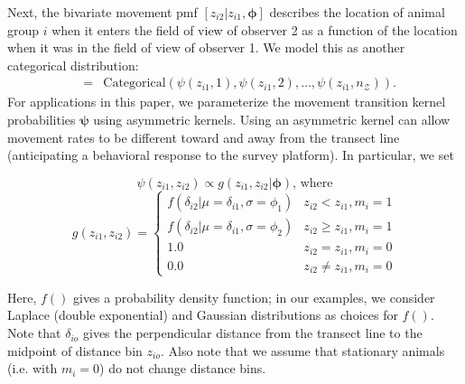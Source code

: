 \documentclass[12pt,fleqn]{article}
\begin{document}
Next, the bivariate movement pmf $[z_{i2}|z_{i1},\boldsymbol{\phi}]$ describes the location of animal group $i$ when it enters the field of view of observer 2 as a function of the location when it was in the field of view of observer 1.  We model this as another categorical distribution:
\begin{eqnarray*}
  [z_{i2}|z_{i1},\boldsymbol{\phi}] & = & \text{Categorical} \left( \psi(z_{i1},1),\psi(z_{i1},2),\hdots,\psi(z_{i1},n_\mathcal{Z}) \right).
\end{eqnarray*}
For applications in this paper, we parameterize the movement transition kernel probabilities $\boldsymbol{\psi}$ using asymmetric kernels.  Using an asymmetric kernel can allow movement rates to be different toward and away from the transect line (anticipating a behavioral response to the survey platform). In particular, we set
\begin{linenomath*}
\begin{equation}
  \psi(z_{i1},z_{i2}) \propto g(z_{i1},z_{i2}|\boldsymbol{\phi}) \text{, where}
  \label{eq:psi}
\end{equation}
\begin{equation}
  g(z_{i1},z_{i2}) = \left\{ \begin{array}{rl}
                                    f(\delta_{i2}|\mu=\delta_{i1},\sigma=\phi_1) & z_{i2}<z_{i1}, m_i = 1 \\
                                    f(\delta_{i2}|\mu=\delta_{i1},\sigma=\phi_2) & z_{i2} \ge z_{i1}, m_i = 1  \\
                                    1.0 & z_{i2}=z_{i1}, m_i=0 \\
                                    0.0 & z_{i2} \ne z_{i1}, m_i=0
                                    \end{array} \right.
  \label{eq:g}
\end{equation}
\end{linenomath*}
Here, $f()$ gives a probability density function; in our examples, we consider Laplace (double exponential) and Gaussian distributions as choices for $f()$. Note that $\delta_{io}$ gives the perpendicular distance from the transect line to the midpoint of distance bin $z_{io}$.  Also note that we assume that stationary animals (i.e. with $m_i=0$) do not change distance bins.
\end{document}
